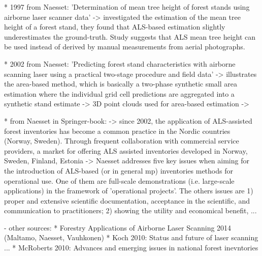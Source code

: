 			* 1997 from Naesset: 'Determination of mean tree height of forest stands using airborne laser scanner data'
			 -> investigated the estimation of the mean tree height of a forest stand, they found that ALS-based estimation
			    slightly underestimates the ground-truth. Study suggests that ALS mean tree height can be used instead of
			    derived by manual measurements from aerial photographs.			
			
			* 2002 from Naesset: 'Predicting forest stand characteristics with airborne scanning laser using a practical two-stage procedure and ﬁeld data'
			  -> illustrates the area-based method, which is basically a two-phase synthetic small area estimation where the individual grid cell predictions
			     are aggregated into a synthetic stand estimate
			  -> 3D point clouds used for area-based estimation
			  -> 
			  
			* from Naesset in Springer-book: 
			  -> since 2002, the application of ALS-assisted forest inventories has become a common practice in the Nordic countries (Norway, Sweden). Through frequent collaboration with commercial service 
			     providers, a market for offering ALS assisted inventories developed in Norway, Sweden, Finland, Estonia
			  -> Naesset addresses five key issues when aiming for the introduction of ALS-based (or in general mp) inventories methods for operational use. One of them are full-scale demonstrations 
			     (i.e. large-scale applications) in the framework of 'operational projects'. 
			     The others issues are 1) proper and extensive scientific documentation, acceptance in the scientific, and communication to practitioners; 2) showing the utility and economical benefit, ...


    -  other sources: 
        * Forestry Applications of Airborne Laser Scanning 2014 (Maltamo, Naesset, Vauhkonen)
        * Koch 2010: Status and future of laser scanning ...
        * McRoberts 2010: Advances and emerging issues in national forest inevntories
        
        
        
        
        
        
        
        
        
        
        
        
        
        
        
        
        
        
        